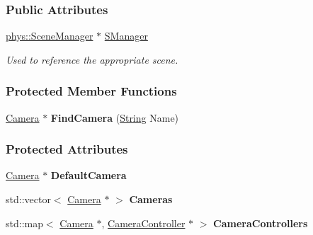 \subsubsection*{Public Attributes}
\begin{DoxyCompactItemize}
\item 
\hypertarget{classphys_1_1CameraManager_a8e89645398c7d334e99280cfa721d864}{
\hyperlink{classphys_1_1SceneManager}{phys::SceneManager} $\ast$ \hyperlink{classphys_1_1CameraManager_a8e89645398c7d334e99280cfa721d864}{SManager}}
\label{d9/d91/classphys_1_1CameraManager_a8e89645398c7d334e99280cfa721d864}

\begin{DoxyCompactList}\small\item\em Used to reference the appropriate scene. \item\end{DoxyCompactList}\end{DoxyCompactItemize}
\subsubsection*{Protected Member Functions}
\begin{DoxyCompactItemize}
\item 
\hypertarget{classphys_1_1CameraManager_a17eb1f44fff4fe4af8683cedba0c9fbf}{
\hyperlink{classphys_1_1Camera}{Camera} $\ast$ {\bfseries FindCamera} (\hyperlink{namespacephys_aa03900411993de7fbfec4789bc1d392e}{String} Name)}
\label{d9/d91/classphys_1_1CameraManager_a17eb1f44fff4fe4af8683cedba0c9fbf}

\end{DoxyCompactItemize}
\subsubsection*{Protected Attributes}
\begin{DoxyCompactItemize}
\item 
\hypertarget{classphys_1_1CameraManager_a1f8aa3d003e6cfed9eee3527118518fb}{
\hyperlink{classphys_1_1Camera}{Camera} $\ast$ {\bfseries DefaultCamera}}
\label{d9/d91/classphys_1_1CameraManager_a1f8aa3d003e6cfed9eee3527118518fb}

\item 
\hypertarget{classphys_1_1CameraManager_a49af26478b62e2246ca1abd19abeec6c}{
std::vector$<$ \hyperlink{classphys_1_1Camera}{Camera} $\ast$ $>$ {\bfseries Cameras}}
\label{d9/d91/classphys_1_1CameraManager_a49af26478b62e2246ca1abd19abeec6c}

\item 
\hypertarget{classphys_1_1CameraManager_a3c5efb4cdc85b5426c43119ef11ee39b}{
std::map$<$ \hyperlink{classphys_1_1Camera}{Camera} $\ast$, \hyperlink{classphys_1_1CameraController}{CameraController} $\ast$ $>$ {\bfseries CameraControllers}}
\label{d9/d91/classphys_1_1CameraManager_a3c5efb4cdc85b5426c43119ef11ee39b}

\end{DoxyCompactItemize}
